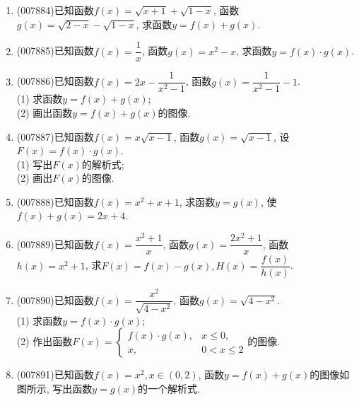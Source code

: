 \documentclass[10pt,a4paper]{article}
\begin{document}
\begin{enumerate}[1.]
\begin{center}
\end{center}
\item {\tiny (007884)}已知函数$f(x)=\sqrt {x+1}+\sqrt {1-x}$, 函数$g(x)=\sqrt {2-x}-\sqrt {1-x}$, 求函数$y=f(x)+g(x)$.
\item {\tiny (007885)}已知函数$f(x)=\dfrac 1x$, 函数$g(x)=x^2-x$, 求函数$y=f(x)\cdot g(x)$.
\item {\tiny (007886)}已知函数$f(x)=2x-\dfrac 1{x^2-1}$, 函数$g(x)=\dfrac 1{x^2-1}-1$.\\
(1) 求函数$y=f(x)+g(x)$;\\
(2) 画出函数$y=f(x)+g(x)$的图像.
\item {\tiny (007887)}已知函数$f(x)=x\sqrt {x-1}$, 函数$g(x)=\sqrt {x-1}$, 设$F(x)=f(x)\cdot g(x)$.\\
(1) 写出$F(x)$的解析式;\\
(2) 画出$F(x)$的图像.
\item {\tiny (007888)}已知函数$f(x)=x^2+x+1$, 求函数$y=g(x)$, 使$f(x)+g(x)=2x+4$.
\item {\tiny (007889)}已知函数$f(x)=\dfrac{x^2+1}x$, 函数$g(x)=\dfrac{2x^2+1}x$, 函数$h(x)=x^2+1$, 求$F(x)=f(x)-g(x),H(x)=\dfrac{f(x)}{h(x)}$.
\item {\tiny (007890)}已知函数$f(x)=\dfrac{x^2}{\sqrt {4-{x^2}}}$, 函数$g(x)=\sqrt {4-x^2}$.\\
(1) 求函数$y=f(x)\cdot g(x)$;\\
(2) 作出函数$F(x)=\begin{cases} f(x)\cdot g(x), & x\le 0, \\ x, & 0<x\le 2 \end{cases}$的图像.
\item {\tiny (007891)}已知函数$f(x)=x^2,x\in (0,2)$, 函数$y=f(x)+g(x)$的图像如图所示, 写出函数$y=g(x)$的一个解析式.
\begin{center}

\end{center}
\end{enumerate}
\end{document}
